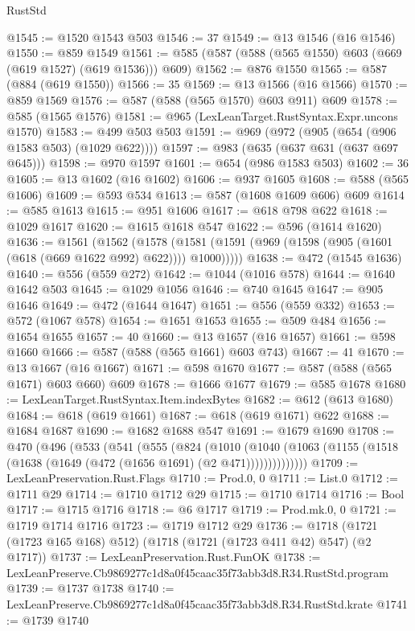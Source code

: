\begin{lexlean}{RustStd}
\begin{coremodule}
@1545 := @1520 @1543 @503
@1546 := 37
@1549 := @13 @1546 (@16 @1546)
@1550 := @859 @1549
@1561 := @585 (@587 (@588 (@565 @1550) @603 (@669 (@619 @1527) (@619 @1536))) @609)
@1562 := @876 @1550
@1565 := @587 (@884 (@619 @1550))
@1566 := 35
@1569 := @13 @1566 (@16 @1566)
@1570 := @859 @1569
@1576 := @587 (@588 (@565 @1570) @603 @911) @609
@1578 := @585 (@1565 @1576)
@1581 := @965 (LexLeanTarget.RustSyntax.Expr.uncons @1570)
@1583 := @499 @503 @503
@1591 := @969 (@972 (@905 (@654 (@906 @1583 @503) (@1029 @622))))
@1597 := @983 (@635 (@637 @631 (@637 @697 @645)))
@1598 := @970 @1597
@1601 := @654 (@986 @1583 @503)
@1602 := 36
@1605 := @13 @1602 (@16 @1602)
@1606 := @937 @1605
@1608 := @588 (@565 @1606)
@1609 := @593 @534
@1613 := @587 (@1608 @1609 @606) @609
@1614 := @585 @1613
@1615 := @951 @1606
@1617 := @618 @798 @622
@1618 := @1029 @1617
@1620 := @1615 @1618 @547
@1622 := @596 (@1614 @1620)
@1636 := @1561
    (@1562
      (@1578 (@1581 (@1591 (@969 (@1598 (@905 (@1601 (@618 (@669 @1622 @992) @622)))) @1000)))))
@1638 := @472 (@1545 @1636)
@1640 := @556 (@559 @272)
@1642 := @1044 (@1016 @578)
@1644 := @1640 @1642 @503
@1645 := @1029 @1056
@1646 := @740 @1645
@1647 := @905 @1646
@1649 := @472 (@1644 @1647)
@1651 := @556 (@559 @332)
@1653 := @572 (@1067 @578)
@1654 := @1651 @1653
@1655 := @509 @484
@1656 := @1654 @1655
@1657 := 40
@1660 := @13 @1657 (@16 @1657)
@1661 := @598 @1660
@1666 := @587 (@588 (@565 @1661) @603 @743)
@1667 := 41
@1670 := @13 @1667 (@16 @1667)
@1671 := @598 @1670
@1677 := @587 (@588 (@565 @1671) @603 @660) @609
@1678 := @1666 @1677
@1679 := @585 @1678
@1680 := LexLeanTarget.RustSyntax.Item.indexBytes
@1682 := @612 (@613 @1680)
@1684 := @618 (@619 @1661)
@1687 := @618 (@619 @1671) @622
@1688 := @1684 @1687
@1690 := @1682 @1688 @547
@1691 := @1679 @1690
@1708 := @470
    (@496
      (@533
        (@541
          (@555
            (@824
              (@1010
                (@1040 (@1063 (@1155 (@1518 (@1638 (@1649 (@472 (@1656 @1691) (@2 @471))))))))))))))
@1709 := LexLeanPreservation.Rust.Flags
@1710 := Prod.{0, 0}
@1711 := List.{0}
@1712 := @1711 @29
@1714 := @1710 @1712 @29
@1715 := @1710 @1714
@1716 := Bool
@1717 := @1715 @1716
@1718 := @6 @1717
@1719 := Prod.mk.{0, 0}
@1721 := @1719 @1714 @1716
@1723 := @1719 @1712 @29
@1736 := @1718 (@1721 (@1723 @165 @168) @512) (@1718 (@1721 (@1723 @411 @42) @547) (@2 @1717))
@1737 := LexLeanPreservation.Rust.FunOK
@1738 := LexLeanPreserve.Cb9869277c1d8a0f45caac35f73abb3d8.R34.RustStd.program
@1739 := @1737 @1738
@1740 := LexLeanPreserve.Cb9869277c1d8a0f45caac35f73abb3d8.R34.RustStd.krate
@1741 := @1739 @1740

\end{coremodule}
\end{lexlean}
